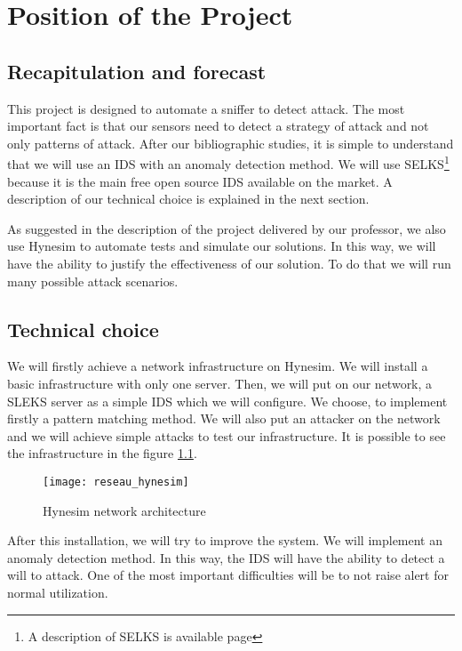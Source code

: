 
\chapter{Position of the Project}
\label{chap:project}


\section{Recapitulation and forecast}

This project is designed to automate a sniffer to detect attack. The most important fact is that our sensors need
to detect a strategy of attack and not only patterns of attack. After our bibliographic studies, it is simple to
understand that we will use an IDS with an anomaly detection method. We will use SELKS\footnote{A description of
  SELKS is available page \pageref{chap:selks}} because it is the main free open source IDS available on the
market. A description of our technical choice is explained in the next section.

As suggested in the description of the project delivered by our professor, we also use Hynesim to automate tests
and simulate our solutions. In this way, we will have the ability to justify the effectiveness of our solution.
To do that we will run many possible attack scenarios.

\section{Technical choice}

We will firstly achieve a network infrastructure on Hynesim. We will install a basic infrastructure with only one
server. Then, we will put on our network, a SLEKS server as a simple IDS which we will configure. We choose, to
implement firstly a pattern matching method. We will also put an attacker on the network and we will achieve simple
attacks to test our infrastructure. It is possible to see the infrastructure in the figure \ref{fig:network_hynesim}.

\begin{figure}[h]
  \centering
  \texttt{[image: reseau\_hynesim]}
  \caption{Hynesim network architecture}
  \label{fig:network_hynesim}
\end{figure}

After this installation, we will try to improve the system. We will implement an anomaly detection method. In this
way, the IDS will have the ability to detect a will to attack. One of the most important difficulties will be to
not raise alert for normal utilization.

